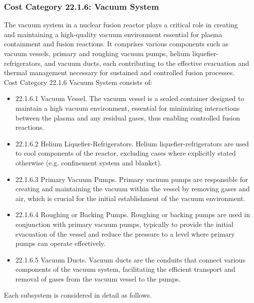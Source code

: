 \subsubsection*{Cost Category 22.1.6: Vacuum System}

The vacuum system in a nuclear fusion reactor plays a critical role in creating and maintaining a high-quality vacuum environment essential for plasma containment and fusion reactions. It comprises various components such as vacuum vessels, primary and roughing vacuum pumps, helium liquefier-refrigerators, and vacuum ducts, each contributing to the effective evacuation and thermal management necessary for sustained and controlled fusion processes. Cost Category 22.1.6 Vacuum System consists of:  

\begin{itemize}
\item 22.1.6.1 Vacuum Vessel.  The vacuum vessel is a sealed container designed to maintain a high vacuum environment, essential for minimizing interactions between the plasma and any residual gases, thus enabling controlled fusion reactions.

\item 22.1.6.2 Helium Liquefier-Refrigerators. Helium liquefier-refrigerators are used to cool components of the reactor, excluding cases where explicitly stated otherwise (e.g. confinement system and blanket). 

\item 22.1.6.3 Primary Vacuum Pumps. Primary vacuum pumps are responsible for creating and maintaining the vacuum within the vessel by removing gases and air, which is crucial for the initial establishment of the vacuum environment.

\item 22.1.6.4 Roughing or Backing Pumps. Roughing or backing pumps are used in conjunction with primary vacuum pumps, typically to provide the initial evacuation of the vessel and reduce the pressure to a level where primary pumps can operate effectively.

\item 22.1.6.5 Vacuum Ducts. Vacuum ducts are the conduits that connect various components of the vacuum system, facilitating the efficient transport and removal of gases from the vacuum vessel to the pumps.
\end{itemize}

Each subsystem is considered in detail as follows. \\

